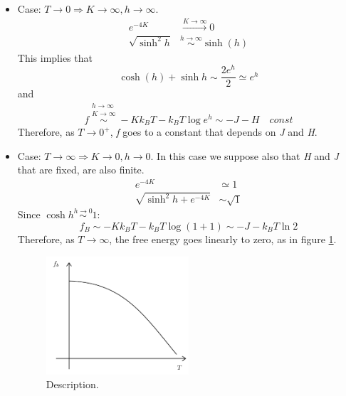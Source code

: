 \documentclass[../main/main.tex]{subfiles}
\begin{document}
\begin{itemize}
\item Case: \( T \rightarrow 0  \Rightarrow K \rightarrow \infty , h \rightarrow \infty  \).
\begin{subequations}
\begin{align}
  e^{-4K} & \overset{K \rightarrow \infty }{\longrightarrow} 0  \\
  \sqrt{\sinh^2 h} & \overset{h \rightarrow \infty }{\sim } \sinh (h)
\end{align}
\end{subequations}
This implies that
\begin{equation}
\cosh(h) + \sinh h \sim \frac{2 e^{h} }{2} \simeq e^{h}
\end{equation}
and
\begin{equation}
  f \overset{\substack{h \rightarrow \infty  \\ K \rightarrow \infty  } }{\sim } - K k_B T - k_B T \log{e^{h} } \sim -J -H \quad const
\end{equation}
Therefore, as \( T \rightarrow 0^+ \), \emph{f} goes to a constant that depends on \emph{J} and \emph{H}.

\item  Case: \( T \rightarrow \infty   \Rightarrow K \rightarrow 0 , h \rightarrow 0  \).
In this case we suppose also that \emph{H} and \emph{J} that are fixed, are also finite.
\begin{subequations}
\begin{align}
  e^{-4K} & \simeq 1  \\
  \sqrt{\sinh^2 h + e^{-4K} } & \sim \sqrt{1}
\end{align}
\end{subequations}
Since \( \cosh h \overset{h \rightarrow 0}{\sim } 1  \):
\begin{equation}
  f_B \sim  -K k_B T - k_B T \log{(1+1)} \sim  -J -k_B T \ln{2}
\end{equation}
Therefore, as \( T \rightarrow \infty  \), the free energy goes linearly to zero, as in figure \ref{fig:8_1}.
\begin{figure}[h!]
\centering
\includegraphics[width=0.5\textwidth]{../lessons/8_image/1.pdf}
\caption{\label{fig:8_1} Description.}
\end{figure}
\end{itemize}
\end{document}
